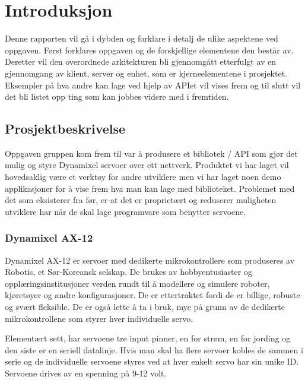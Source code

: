 \documentclass[12pt]{report}
\begin{document}
\tableofcontents


\chapter{Introduksjon}
Denne rapporten vil gå i dybden og forklare i detalj de ulike aspektene ved oppgaven.
Først forklares oppgaven og de forskjellige elementene den består av. Deretter vil den overordnede arkitekturen bli gjennomgått etterfulgt av en gjennomgang av klient, server og enhet, som er kjerneelementene i prosjektet.
Eksempler på hva andre kan lage ved hjelp av APIet vil vises frem og til slutt vil det bli listet opp ting som kan jobbes videre med i fremtiden.

\section{Prosjektbeskrivelse}
Oppgaven gruppen kom frem til var å produsere et bibliotek / API som gjør det mulig og styre Dynamixel servoer \cite{Dynamixel} over ett nettverk. Produktet vi har laget vil hovedsaklig være et verktøy for andre utviklere men vi har laget noen demo applikasjoner for å vise frem hva man kan lage med biblioteket. Problemet med det som eksisterer fra før, er at det er proprietært og reduserer muligheten utviklere har når de skal lage programvare som benytter servoene.

\subsection{Dynamixel AX-12}
Dynamixel AX-12 er servoer med dedikerte mikrokontrollere som produseres av Robotis, et Sør-Koreansk selskap. De brukes av hobbyentusiaster og opplæringsinstitusjoner verden rundt til å modellere og simulere roboter, kjøretøyer og andre konfigurasjoner. De er ettertraktet fordi de er billige, robuste og svært fleksible. De er også lette å ta i bruk, mye på grunn av de dedikerte mikrokontrollene som styrer hver individuelle servo.

Elementært sett, har servoene tre input pinner, en for strøm, en for jording og den siste er en seriell datalinje. Hvis man skal ha flere servoer kobles de sammen i serie og de individuelle servoene styres ved at hver enkelt servo har sin unike ID. Servoene drives av en spenning på 9-12 volt.
\end{document}

